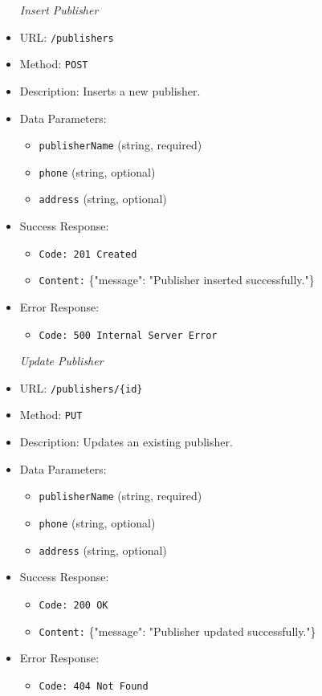 \begin{itemize}
\item[\textit{Insert Publisher}]
\item URL: \texttt{/publishers}  
\item Method: \texttt{POST}  
\item Description: Inserts a new publisher.
\item Data Parameters:
\begin{itemize}
  \item \texttt{publisherName} (string, required)
  \item \texttt{phone} (string, optional)
  \item \texttt{address} (string, optional)
\end{itemize}
\item Success Response:
\begin{itemize}
  \item \texttt{Code: 201 Created}
  \item \texttt{Content:} \{"message": "Publisher inserted successfully."\}
\end{itemize}
\item Error Response:
\begin{itemize}
  \item \texttt{Code: 500 Internal Server Error}
\end{itemize}


\item[\textit{Update Publisher}] 
\item URL: \texttt{/publishers/\{id\}}  
\item Method: \texttt{PUT}  
\item Description: Updates an existing publisher.
\item Data Parameters:
\begin{itemize}
  \item \texttt{publisherName} (string, required)
  \item \texttt{phone} (string, optional)
  \item \texttt{address} (string, optional)
\end{itemize}
\item Success Response:
\begin{itemize}
  \item \texttt{Code: 200 OK}
  \item \texttt{Content:} \{"message": "Publisher updated successfully."\}
\end{itemize}
\item Error Response:
\begin{itemize}
  \item \texttt{Code: 404 Not Found}
\end{itemize}



\end{itemize}
